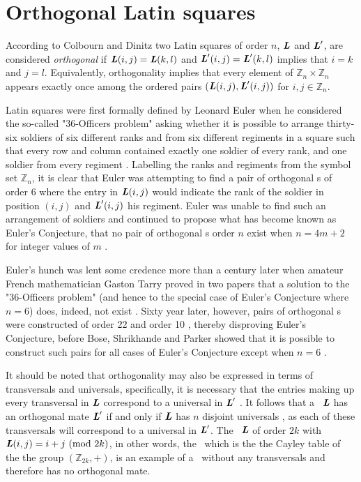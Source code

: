 \section{Orthogonal Latin squares}
According to Colbourn and Dinitz \cite[Definition 3.1]{colb} two Latin squares of order $n$, $\mbox{\bf \emph{L}}$ and $\mbox{\bf \emph{L}}'$, are considered \emph{orthogonal} if $\mbox{\bf \emph{L}}(i,j) = \mbox{\bf \emph{L}}(k,l)$ and $\mbox{\bf \emph{L}}'(i,j) = \mbox{\bf \emph{L}}'(k,l)$ implies that $i=k$ and $j=l$. Equivalently, orthogonality implies that every element of $\mathbb{Z}_n \times \mathbb{Z}_n$ appears exactly once among the ordered pairs $(\mbox{\bf \emph{L}}(i,j), \mbox{\bf \emph{L}}'(i,j))$ for $i,j \in \mathbb{Z}_n$.

Latin squares were first formally defined by Leonard Euler when he considered the so-called "36-Officers problem" asking whether it is possible to arrange thirty-six soldiers of six different ranks and from six different regiments in a square such that every row and column contained exactly one soldier of every rank, and one soldier from every regiment \cite{euler}. Labelling the ranks and regiments from the symbol set $\mathbb{Z}_n$, it is clear that Euler was attempting to find a pair of orthogonal \lat s of order 6 where the entry in $\mbox{\bf \emph{L}}(i,j)$ would indicate the rank of the soldier in position $(i,j)$ and $\mbox{\bf \emph{L}}'(i,j)$ his regiment.  Euler was unable to find such an arrangement of soldiers and continued to propose what has become known as Euler's Conjecture, that no pair of orthogonal \lat s order $n$ exist when $n=4m+2$ for integer values of $m$ \cite{euler}.

 Euler's hunch was lent some credence more than a century later when amateur French mathematician Gaston Tarry proved in two papers that a solution to the "36-Officers problem" (and hence to the special case of Euler's Conjecture where $n=6$) does, indeed,  not exist \cite{tarry}. Sixty year later, however, pairs of orthogonal \lat s were constructed of order 22 \cite{bose1} and order 10 \cite{parker1959construction}, thereby disproving Euler's Conjecture, before Bose, Shrikhande and Parker showed  that it is possible to construct such pairs for all cases of Euler's Conjecture except when $n=6$ \cite{bose}.

It should be noted that orthogonality may also be expressed in terms of transversals and universals, specifically, it is necessary that the entries making up every transversal in $\mbox{\bf \emph{L}}$ correspond to a universal in $\mbox{\bf \emph{L}}'$ \cite[p. 183]{wallis}. It follows that a \lat \ $\mbox{\bf \emph{L}}$ has an  orthogonal mate $\mbox{\bf \emph{L}}'$ if and only if $\mbox{\bf \emph{L}}$ has $n$ disjoint universals \cite[Theorem 5.1.1]{denes1}, as each of these transversals will correspond to a universal in $\mbox{\bf \emph{L}}'$. The \lat \ $\mbox{\bf \emph{L}}$ of order $2k$ with $\mbox{\bf \emph{L}}(i,j) = i+j \mbox{ (mod $2k$)}$, in other words, the \lat  \ which is the the Cayley table of the the group $(\mathbb{Z}_{2k}, +)$, is an example of a \lat \ without any transversals and therefore has no orthogonal mate.

